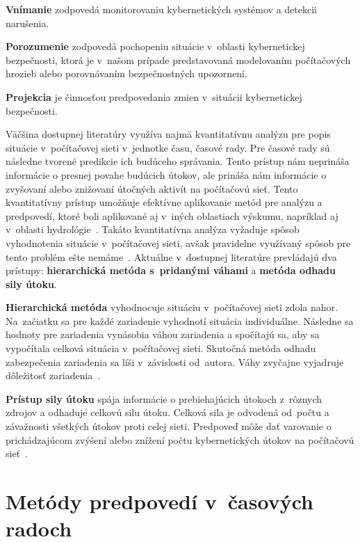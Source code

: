 \documentclass[thesismargins, thesislinespacing, openright, upjsfrontpage]{rnthesis}
\begin{document}
\begin{compactenum}
    \item \textbf{Vnímanie} zodpovedá monitorovaniu kybernetických systémov a detekcii narušenia.
    \item \textbf{Porozumenie} zodpovedá pochopeniu situácie v~oblasti kybernetickej bezpečnosti, ktorá je v~našom prípade predstavovaná modelovaním počítačových hrozieb alebo porovnávaním bezpečnostných upozornení. 
    \item \textbf{Projekcia} je činnosťou predpovedania zmien v~situácii kybernetickej bezpečnosti. 
\end{compactenum}

Väčšina dostupnej literatúry využíva najmä kvantitatívnu analýzu pre popis situácie v~počítačovej sieti v~jednotke času, časové rady. Pre časové rady sú následne tvorené predikcie ich budúceho správania. Tento prístup nám neprináša informácie o presnej povahe budúcich útokov, ale prináša nám informácie o zvyšovaní alebo znižovaní útočných aktivít na počítačovú sieť. Tento kvantitatívny prístup umožňuje efektívne aplikovanie metód pre analýzu a predpovedí, ktoré boli aplikované aj v~iných oblastiach výskumu, napríklad aj v~oblasti hydrológie~\cite{wang2009comparison}. Takáto kvantitatívna analýza vyžaduje spôsob vyhodnotenia situácie v~počítačovej sieti, avšak pravidelne využívaný spôsob pre tento problém ešte nemáme~\cite{husak2020preprint}. Aktuálne v~dostupnej literatúre prevládajú dva prístupy: \textbf{hierarchická metóda s~pridanými váhami} a \textbf{metóda odhadu sily útoku}. 

\textbf{Hierarchická metóda} vyhodnocuje situáciu v~počítačovej sieti zdola nahor. Na~začiatku sa pre každé zariadenie vyhodnotí situácia individuálne. Následne sa hodnoty pre  zariadenia vynásobia váhou zariadenia a spočítajú sa, aby sa vypočítala celková situácia v~počítačovej sieti. Skutočná metóda odhadu zabezpečenia zariadenia  sa líši v~závislosti od~autora. Váhy zvyčajne vyjadruje dôležitosť zariadenia~\cite{Husak2018survey}.

\textbf{Prístup sily útoku} spája informácie o prebiehajúcich útokoch z~rôznych zdrojov a odhaduje celkovú silu útoku. Celková sila je odvodená od~počtu a závažnosti všetkých útokov proti celej sieti. Predpoveď môže dať varovanie o prichádzajúcom zvýšení alebo znížení počtu kybernetických útokov na počítačovú sieť~\cite{Husak2018survey}.

\section{Metódy predpovedí v~časových radoch}
\end{document}
